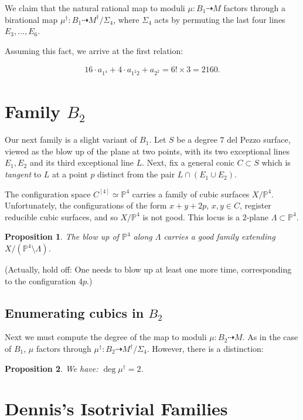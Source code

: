 \documentclass{article}
\newtheorem{proposition}{Proposition}[section]
\renewcommand{\P}{\mathbb{P}}
\newcommand{\<}{\left\langle}
\renewcommand{\>}{\right\rangle}
\begin{document}
  We claim that the natural rational map to moduli
  $\mu : B_1 \dashrightarrow M$ factors through a birational map
  $\mu^{\dagger}: B_1 \dashrightarrow M^{\dagger}/\Sigma_{4}$, where
  $\Sigma_{4}$ acts by permuting the last four lines
  $E_{3}, \dots, E_{6}$.

Assuming this fact, we arrive at the first relation:

\begin{align}
  \label{eq:relation1}
  16 \cdot a_{1^4} + 4 \cdot a_{1^2 2} + a_{2^2} = 6! \times 3 = 2160.
\end{align}

\section{Family $B_2$}
\label{sec:family-b_2}

Our next family is a slight variant of $B_1$. Let $S$ be a degree $7$
del Pezzo surface, viewed as the blow up of the plane at two points,
with its two exceptional lines $E_1, E_2$ and its third exceptional
line $L$.  Next, fix a general conic $C \subset S$ which is {\sl
  tangent} to $L$ at a point $p$ distinct from the pair
$L \cap (E_1 \cup E_2)$.

The configuration space $C^{[4]} \simeq \P^{4}$ carries a family of
cubic surfaces $X/\P^{4}$.  Unfortunately, the configurations of the
form $x+y+2p$, $x,y \in C$, register reducible cubic surfaces, and so
$X/\P^{4}$ is not good.  This locus is a $2$-plane
$\Lambda \subset \P^{4}$.

\begin{proposition}
  \label{proposition:resolveB2} The blow up of $\P^{4}$ along
  $\Lambda$ carries a good family extending
  $X/(\P^{4} \setminus \Lambda)$.
\end{proposition}
(Actually, hold off: One needs to blow up at least one more time,
corresponding to the configuration $4p$.)
\subsection{Enumerating cubics in $B_2$}
\label{sec:enum-cubics-b_2}

Next we must compute the degree of the map to moduli
$\mu: B_2 \dashrightarrow M$. As in the case of $B_1$, $\mu$ factors
through $\mu^{\dagger}: B_2 \dashrightarrow M^\dagger/\Sigma_{4}$.
However,  there is a distinction:

\begin{proposition}
  \label{proposition:deg-mudagger2}
  We have: $\deg \mu^{\dagger} = 2$.
\end{proposition}


\section{Dennis's Isotrivial Families}
\label{sec:denn-isotr-famil}




%
%
\end{document}
